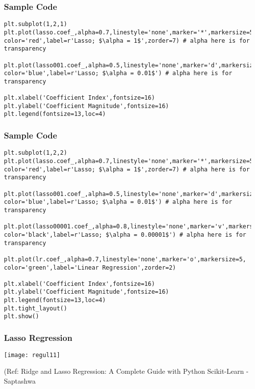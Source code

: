 \begin{frame}[fragile]\frametitle{Sample Code}

\begin{lstlisting}
plt.subplot(1,2,1)
plt.plot(lasso.coef_,alpha=0.7,linestyle='none',marker='*',markersize=5,
color='red',label=r'Lasso; $\alpha = 1$',zorder=7) # alpha here is for transparency

plt.plot(lasso001.coef_,alpha=0.5,linestyle='none',marker='d',markersize=6,
color='blue',label=r'Lasso; $\alpha = 0.01$') # alpha here is for transparency

plt.xlabel('Coefficient Index',fontsize=16)
plt.ylabel('Coefficient Magnitude',fontsize=16)
plt.legend(fontsize=13,loc=4)
\end{lstlisting}

\end{frame}

\begin{frame}[fragile]\frametitle{Sample Code}

\begin{lstlisting}
plt.subplot(1,2,2)
plt.plot(lasso.coef_,alpha=0.7,linestyle='none',marker='*',markersize=5,
color='red',label=r'Lasso; $\alpha = 1$',zorder=7) # alpha here is for transparency

plt.plot(lasso001.coef_,alpha=0.5,linestyle='none',marker='d',markersize=6,
color='blue',label=r'Lasso; $\alpha = 0.01$') # alpha here is for transparency

plt.plot(lasso00001.coef_,alpha=0.8,linestyle='none',marker='v',markersize=6,
color='black',label=r'Lasso; $\alpha = 0.00001$') # alpha here is for transparency

plt.plot(lr.coef_,alpha=0.7,linestyle='none',marker='o',markersize=5,
color='green',label='Linear Regression',zorder=2)

plt.xlabel('Coefficient Index',fontsize=16)
plt.ylabel('Coefficient Magnitude',fontsize=16)
plt.legend(fontsize=13,loc=4)
plt.tight_layout()
plt.show()
\end{lstlisting}

\end{frame}




\begin{frame}[fragile]\frametitle{Lasso Regression}

\begin{center}
\texttt{[image: regul11]}
\end{center}

{\tiny (Ref: Ridge and Lasso Regression: A Complete Guide with Python Scikit-Learn - Saptashwa}
\end{frame}


